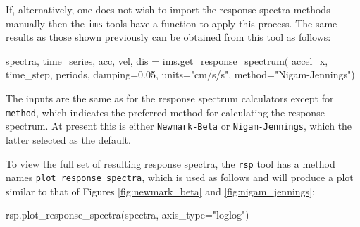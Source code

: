 If, alternatively, one does not wish to import the response spectra methods manually then the \verb=ims= tools have a function to apply this process. The same results as those shown previously can be obtained from this tool as follows:

\begin{python}
spectra, time_series, acc, vel, dis = ims.get_response_spectrum(
    accel_x,
    time_step,
    periods,
    damping=0.05,
    units="cm/s/s",
    method="Nigam-Jennings") 
\end{python}

The inputs are the same as for the response spectrum calculators except for \verb=method=, which indicates the preferred method for calculating the response spectrum. At present this is either \verb=Newmark-Beta= or \verb=Nigam-Jennings=, which the latter selected as the default.

To view the full set of resulting response spectra, the \verb=rsp= tool has a method names \verb=plot_response_spectra=, which is used as follows and will produce a plot similar to that of Figures \ref{fig:newmark_beta} and \ref{fig:nigam_jennings}:

\begin{python}
rsp.plot_response_spectra(spectra,
                          axis_type="loglog")
\end{python}

